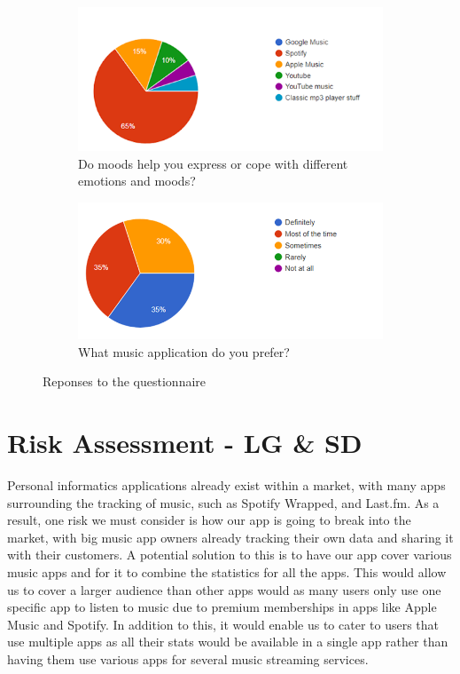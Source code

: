 \documentclass[11pt]{report}
\begin{document}
\begin{figure}[h]
\centering
\begin{subfigure}{0.5\textwidth}
	\centering	
	\includegraphics[width=0.9\linewidth]{question-moods.png}
	\caption{Do moods help you express or cope with different emotions and moods?}
	\label{fig:question-moods}
\end{subfigure}%
\begin{subfigure}{0.5\textwidth}
	\centering
	\includegraphics[width=0.9\linewidth]{question-format.png}
	\caption{What music application do you prefer?}
	\label{fig:question-format}
\end{subfigure}

\caption{Reponses to the questionnaire}
\label{fig:question}

\end{figure}


\chapter{Risk Assessment - LG \& SD}
Personal informatics applications already exist within a market, with many apps surrounding the tracking of music, such as Spotify Wrapped, and Last.fm. As a result, one risk we must consider is how our app is going to break into the market, with big music app owners already tracking their own data and sharing it with their customers. A potential solution to this is to have our app cover various music apps and for it to combine the statistics for all the apps. This would allow us to cover a larger audience than other apps would as many users only use one specific app to listen to music due to premium memberships in apps like Apple Music and Spotify. In addition to this, it would enable us to cater to users that use multiple apps as all their stats would be available in a single app rather than having them use various apps for several music streaming services.
\end{document}
